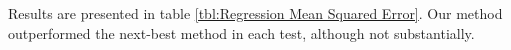 Results are presented in table \ref{tbl:Regression Mean Squared Error}.  Our method outperformed the next-best method in each test, although not substantially.

%
%
%
%
%
%
%
%
%










